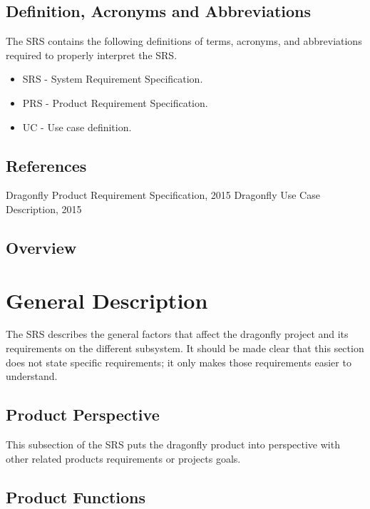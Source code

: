 \documentclass[a4paper]{article}
\begin{document}
\subsection{Definition, Acronyms and Abbreviations}

The SRS contains the following definitions of terms, acronyms, and abbreviations required to properly interpret the SRS.
\begin{itemize}
	\item SRS - System Requirement Specification.
	\item PRS - Product Requirement Specification.
	\item UC  - Use case definition.
\end{itemize}

\subsection{References}

\begin{thebibliography}{99}
	 Dragonfly Product Requirement Specification, 2015
	 Dragonfly Use Case Description, 2015
\end{thebibliography}

\subsection{Overview}

\section{General Description}

The SRS describes the general factors that affect the dragonfly project and its requirements on the different subsystem. It should be made clear that this section does not state specific requirements; it only makes those requirements easier to understand.

\subsection{Product Perspective}

This subsection of the SRS puts the dragonfly product into perspective with other related products requirements or projects goals.

\subsection{Product Functions}
\end{document}
